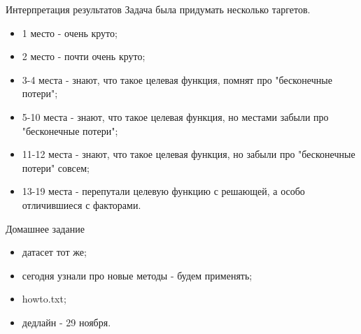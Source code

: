 \documentclass[14pt, fleqn, xcolor={dvipsnames, table}]{beamer}
\begin{document}
\begin{frame}{Интерпретация результатов}
Задача была придумать несколько таргетов.
\begin{center}
\begin{itemize}
\item 1 место - очень круто;
\item 2 место - почти очень круто;
\item 3-4 места - знают, что такое целевая функция, помнят про "бесконечные потери";
\item 5-10 места - знают, что такое целевая функция, но местами забыли про "бесконечные потери";
\item 11-12 места - знают, что такое целевая функция, но забыли про "бесконечные потери" совсем;
\item 13-19 места - перепутали целевую функцию с решающей, а особо отличившиеся с факторами.
\end{itemize}
\end{center}
\end{frame}

\begin{frame}{Домашнее задание}
\begin{itemize}
\item датасет тот же;
\item сегодня узнали про новые методы - будем применять;
\item howto.txt;
\item дедлайн - 29 ноября.
\end{itemize}
\end{frame}
\end{document}
